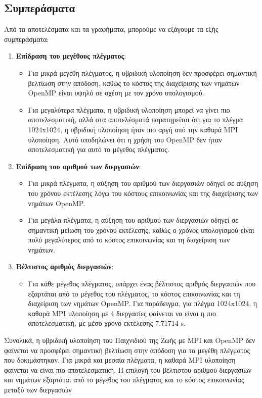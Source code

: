 \documentclass{article}
\begin{document}
\subsection*{Συμπεράσματα}
Από τα αποτελέσματα και τα γραφήματα, μπορούμε να εξάγουμε τα εξής συμπεράσματα:
\begin{enumerate}
    \item \textbf{Επίδραση του μεγέθους πλέγματος}:
    \begin{itemize}
        \item Για μικρά μεγέθη πλέγματος, η υβριδική υλοποίηση δεν προσφέρει σημαντική βελτίωση στην απόδοση, καθώς το κόστος της διαχείρισης των νημάτων OpenMP είναι υψηλό σε σχέση με τον χρόνο υπολογισμού.
        \item Για μεγαλύτερα πλέγματα, η υβριδική υλοποίηση μπορεί να γίνει πιο αποτελεσματική, αλλά στα αποτελέσματά παρατηρείται ότι για το πλέγμα 1024x1024, η υβριδική υλοποίηση ήταν πιο αργή από την καθαρά MPI υλοποίηση. Αυτό υποδηλώνει ότι η χρήση του OpenMP δεν ήταν αποτελεσματική για αυτό το μέγεθος πλέγματος.
    \end{itemize}
        \item \textbf{Επίδραση του αριθμού των διεργασιών}:
    \begin{itemize}
        \item Για μικρά πλέγματα, η αύξηση του αριθμού των διεργασιών οδηγεί σε αύξηση του χρόνου εκτέλεσης λόγω του κόστους επικοινωνίας και της διαχείρισης των νημάτων OpenMP.
        \item Για μεγάλα πλέγματα, η αύξηση του αριθμού των διεργασιών οδηγεί σε σημαντική μείωση του χρόνου εκτέλεσης, καθώς ο χρόνος υπολογισμού είναι πολύ μεγαλύτερος από το κόστος επικοινωνίας και τη διαχείριση των νημάτων.
    \end{itemize}
        \item \textbf{Βέλτιστος αριθμός διεργασιών}:
    \begin{itemize}
        \item Για κάθε μέγεθος πλέγματος, υπάρχει ένας βέλτιστος αριθμός διεργασιών που εξαρτάται από το μέγεθος του πλέγματος, το κόστος επικοινωνίας και τη διαχείριση των νημάτων OpenMP. Για παράδειγμα, για πλέγμα 1024x1024, η καθαρά MPI υλοποίηση με 4 διεργασίες φαίνεται να είναι η πιο αποτελεσματική, με μέσο χρόνο εκτέλεσης 7.71714 s.
    \end{itemize}
\end{enumerate}
Συνολικά, η υβριδική υλοποίηση του Παιχνιδιού της Ζωής με MPI και OpenMP δεν φαίνεται να προσφέρει σημαντική βελτίωση στην απόδοση για τα μεγέθη πλέγματος που δοκιμάστηκαν. Για μικρά και μεσαία πλέγματα, η καθαρά MPI υλοποίηση φαίνεται να είναι πιο αποτελεσματική. Η επιλογή του βέλτιστου αριθμού διεργασιών και νημάτων εξαρτάται από το μέγεθος του πλέγματος και το κόστος επικοινωνίας μεταξύ των διεργασιών
\end{document}
